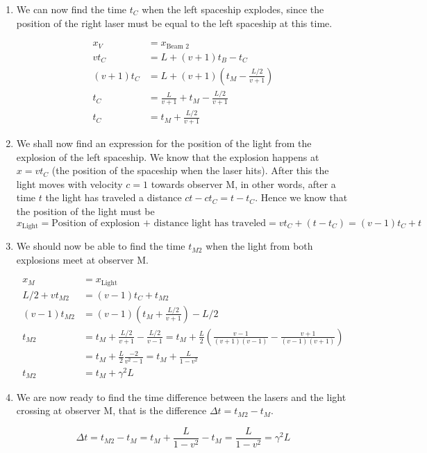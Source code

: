 \documentclass[a4paper,10pt,english]{article}
\begin{document}
\begin{enumerate}
\item We can now find the time $t_{C}$ when the left spaceship explodes, since the position of the right laser must be equal to the left spaceship at this time.

\begin{align*}
x_{V}&=x_{\text{Beam 2}}\\
vt_{C}&=L+(v+1)t_{B}-t_{C}\\
(v+1)t_{C}&=L+(v+1)\left(t_{M}-\frac{L/2}{v+1}\right)\\
t_{C}&=\frac{L}{v+1}+t_{M}-\frac{L/2}{v+1}\\
t_{C}&=t_{M}+\frac{L/2}{v+1}
\end{align*}

\item We shall now find an expression for the position of the light from the explosion of the left spaceship. We know that the explosion happens at $x=vt_{C}$ (the position of the spaceship when the laser hits). After this the light moves with velocity $c=1$ towards observer M, in other words, after a time $t$ the light has traveled a distance $ct-ct_{C}=t-t_{C}$. Hence we know that the position of the light must be
\[
x_{\text{Light}}=\text{Position of explosion + distance light has traveled}=vt_{C}+(t-t_{C})=(v-1)t_{C}+t
\]
\item We should now be able to find the time $t_{M2}$ when the light from both explosions meet at observer M.

\begin{align*}
x_{M}&=x_{\text{Light}}\\
L/2+vt_{M2}&=(v-1)t_{C}+t_{M2}\\
(v-1)t_{M2}&=(v-1)\left(t_{M}+\frac{L/2}{v+1}\right)-L/2\\
t_{M2}&=t_{M}+\frac{L/2}{v+1}-\frac{L/2}{v-1}=t_{M}+\frac{L}{2}\left(\frac{v-1}{(v+1)(v-1)}-\frac{v+1}{(v-1)(v+1)}\right)\\
&=t_{M}+\frac{L}{2}\frac{-2}{v^{2}-1}=t_{M}+\frac{L}{1-v^{2}}\\
t_{M2}&=t_{M}+\gamma^{2}L
\end{align*}

\item We are now ready to find the time difference between the lasers and the light crossing at observer M, that is the difference $\Delta t=t_{M2}-t_{M}$.

\begin{equation*}
\Delta t=t_{M2}-t_{M}=t_{M}+\frac{L}{1-v^{2}}-t_{M}=\frac{L}{1-v^{2}}=\gamma^{2}L
\end{equation*}


\end{enumerate}
\end{document}
